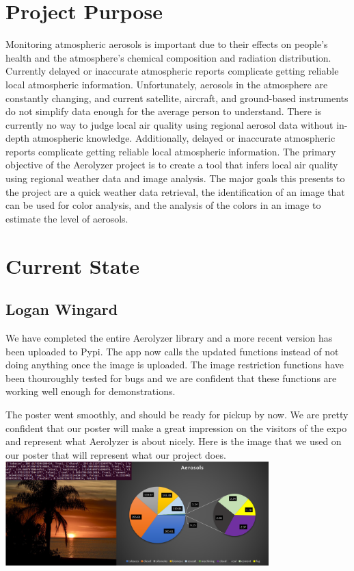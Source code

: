 \documentclass[onecolumn, draftclsnofoot,10pt, compsoc]{IEEEtran}
\begin{document}
\tableofcontents
\clearpage

\begin{singlespace}

	\section{Project Purpose}
		Monitoring atmospheric aerosols is important due to their effects on people’s health and the atmosphere's chemical composition and radiation distribution.
		Currently delayed or inaccurate atmospheric reports complicate getting reliable local atmospheric information.
		Unfortunately, aerosols in the atmosphere are constantly changing, and current satellite, aircraft, and ground-based instruments do not simplify data enough for the average person to understand.
		There is currently no way to judge local air quality using regional aerosol data without in-depth atmospheric knowledge.
		Additionally, delayed or inaccurate atmospheric reports complicate getting reliable local atmospheric information.
		The primary objective of the Aerolyzer project is to create a tool that infers local air quality using regional weather data and image analysis.
		The major goals this presents to the project are a quick weather data retrieval, the identification of an image that can be used for color analysis, and the analysis of the colors in an image to estimate the level of aerosols.
	
	\section{Current State}
		
		\subsection{Logan Wingard}
			We have completed the entire Aerolyzer library and a more recent version has been uploaded to Pypi. 
			The app now calls the updated functions instead of not doing anything once the image is uploaded.
			The image restriction functions have been thouroughly tested for bugs and we are confident that these functions are working well enough for demonstrations.

			The poster went smoothly, and should be ready for pickup by now.
			We are pretty confident that our poster will make a great impression on the visitors of the expo and represent what Aerolyzer is about nicely.
			Here is the image that we used on our poster that will represent what our project does.\\
			\includegraphics[height=4cm,natwidth=1098,natheight=432]{images/posterimg.png}

\end{singlespace}
\end{document}
